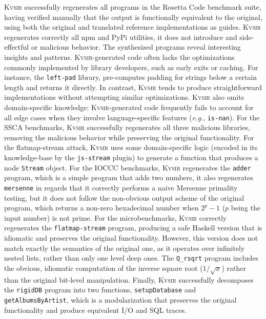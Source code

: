 \documentclass[nonacm,sigplan,review]{acmart}
\def\eg{{\em e.g.}, }
\newcommand{\sys}{{\scshape Kv{\textalpha}sir}\xspace}
\newcommand{\ttt}[1]{\texttt{#1}\xspace}
\begin{document}
\sys successfully regenerates all programs in the Rosetta Code benchmark suite,
having verified manually that the output is functionally equivalent
to the original, using both the original and translated reference
implementations as guides.
\sys regenerates correctly all npm and PyPi utilities, it does not introduce and side-effectful or malicious behavior.
The synthesized programs reveal interesting insights and patterns.
\sys-generated code often lacks the optimizations commonly
implemented by library developers, such as early exits or caching.
For instance, the \texttt{left-pad} library, pre-computes padding for strings below a certain length
and returns it directly.
In contrast, \sys tends to produce straightforward
implementations without attempting similar optimizations.
\sys also omits domain-specific knowledge:
\sys-generated code frequently fails to account for all edge cases when they involve language-specific features (\eg \ttt{is-nan}).
For the SSCA benchmarks, \sys successfully regenerates all three malicious libraries, removing the malicious behavior while preserving the original functionality.
For the flatmap-stream attack, \sys uses some domain-specific logic (encoded in its knowledge-base by the \ttt{js-stream} plugin) to generate a function that produces a node \ttt{Stream} object.
For the IOCCC benchmarks, \sys regenerates the \ttt{adder} program, which is a simple program that adds two numbers,
it also regenerates \ttt{mersenne} in regards that it correctly performs a naive Mersenne primality testing, but it does not follow the non-obvious output scheme of the original program, which returns a non-zero hexadecimal number when $2^p - 1$ ($p$ being the input number) is not prime.
For the microbenchmarks, \sys correctly regenerates the \ttt{flatmap-stream} program, producing a safe Haskell version that is idiomatic and preserves the original functionality.
However, this version does not match exactly the semantics of the original one, as it operates over infinitely nested lists, rather than only one level deep ones.
The \ttt{Q\_rsqrt} program includes the obvious, idiomatic computation of the inverse square root ($1/\sqrt{x}$) rather than the original bit-level manipulation.
Finally, \sys successfully decomposes the \ttt{rigidDB} program into two
functions, \ttt{setupDatabase} and \ttt{getAlbumsByArtist}, which is a
modularization that preserves the original functionality and produce equivalent I/O and SQL traces.
\end{document}
